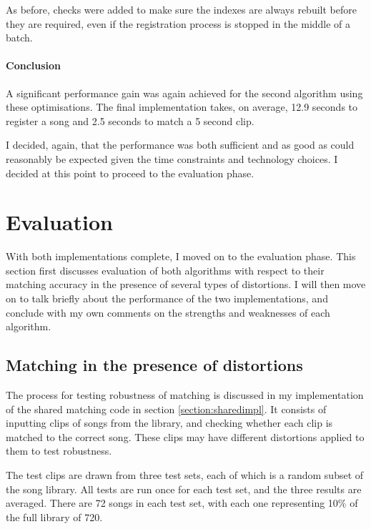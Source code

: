 \documentclass[12pt,a4paper,twoside,openright]{report}
\begin{document}
As before, checks were added to make sure the indexes are always rebuilt before they are required, even if the registration process is stopped in the middle of a batch.


\subsubsection{Conclusion}

A significant performance gain was again achieved for the second algorithm using these optimisations. The final implementation takes, on average, 12.9 seconds to register a song and 2.5 seconds to match a 5 second clip.

I decided, again, that the performance was both sufficient and as good as could reasonably be expected given the time constraints and technology choices. I decided at this point to proceed to the evaluation phase.



\chapter{Evaluation}
\label{evaluation}

With both implementations complete, I moved on to the evaluation phase. This section first discusses evaluation of both algorithms with respect to their matching accuracy in the presence of several types of distortions. I will then move on to talk briefly about the performance of the two implementations, and conclude with my own comments on the strengths and weaknesses of each algorithm.


\section{Matching in the presence of distortions}
\label{evaluation:matching_with_distortion}

The process for testing robustness of matching is discussed in my implementation of the shared matching code in section \ref{section:sharedimpl}. It consists of inputting clips of songs from the library, and checking whether each clip is matched to the correct song. These clips may have different distortions applied to them to test robustness.

The test clips are drawn from three test sets, each of which is a random subset of the song library. All tests are run once for each test set, and the three results are averaged. There are 72 songs in each test set, with each one representing 10\% of the full library of 720.
\end{document}

